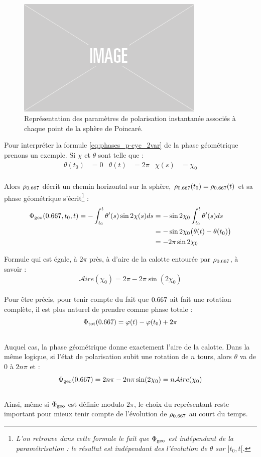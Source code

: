 \begin{figure}[h]
	\includegraphics[width=0.8\textwidth]{fig/placeholder}
	\caption{Représentation des paramètres de polarisation instantanée associés à chaque point de la sphère de Poincaré.}
\end{figure}


Pour interpréter la formule \eqref{eq:phases_p-cyc_2var} de la phase géométrique prenons un exemple. Si $\chi$ et $\theta$ sont telle que :
\begin{align*}
	\theta(t_0) &= 0  &  \theta(t) &= 2\pi  &  \chi(s) &= \chi_0
\end{align*}
\\
Alors $\rho_{\x}$ décrit un chemin horizontal sur la sphère, $\rho_{\x}(t_0) = \rho_{\x}(t)$ et sa phase géométrique s'écrit\footnote{\itshape 
	L'on retrouve dans cette formule le fait que $\Phi_{\text{\normalfont geo}}$ est indépendant de la paramétrisation : le résultat est indépendant des l'évolution de $\theta$ sur $]t_0,t[$.} :
\begin{align*}
	\phaseg(\x, t_0, t) = -\int_{t_0}^t \theta'(s) \sin 2\chi(s) ds &= - \sin 2\chi_0 \int_{t_0}^t \theta'(s) ds \\
	&= - \sin 2\chi_0 \big( \theta(t) - \theta(t_0)\big) \\
	&= - 2\pi\sin 2\chi_0
\end{align*}
\skipl

Formule qui est égale, à $2\pi$ près, à d'aire de la calotte entourée par $\rho_{\x}$, à savoir :
\[\mathcal{A}ire(\chi_0) = 2\pi - 2\pi \sin(2\chi_0)\]
\\
Pour être précis, pour tenir compte du fait que $\x$ ait fait une rotation complète, il est plus naturel de prendre comme phase totale :
\[\phaset(\x) = \varphi(t) - \varphi(t_0) + 2\pi\]
\\
Auquel cas, la phase géométrique donne exactement l'aire de la calotte. Dans la même logique, si l'état de polarisation subit une rotation de $n$ tours, alors $\theta$ va de $0$ à $2n\pi$ et :
\[\phaseg(\x) = 2n\pi - 2n\pi\sin(2\chi_0) = n\mathcal{A}ire(\chi_0)\]
\\
Ainsi, même si $\Phi_{\text{\normalfont geo}}$ est définie modulo $2\pi$, le choix du représentant reste important pour mieux tenir compte de l'évolution de $\rho_{\x}$ au court du temps.
\\

